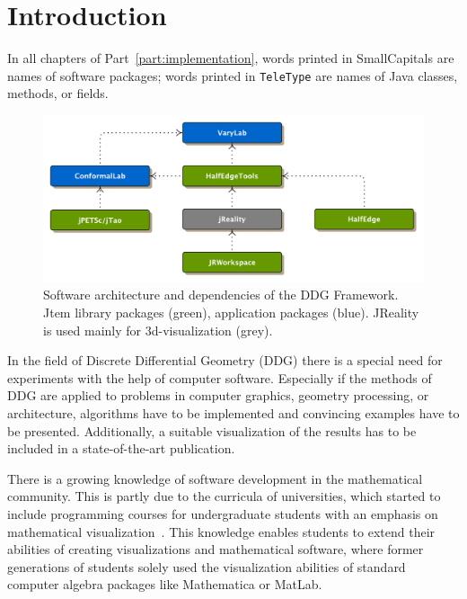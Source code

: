 \documentclass[Thesis.tex]{subfiles}
\begin{document}
\chapter{Introduction}

In all chapters of Part~\ref{part:implementation}, words printed in {\sc SmallCapitals} are names of software packages; words printed
in {\tt TeleType} are names of {\sc Java} classes, methods, or fields.

\begin{figure}[h]
	\centering
	\includegraphics[width=\linewidth]{figures/software_architecture}
	\caption[Software package dependencies]{
		Software architecture and dependencies of the DDG Framework. 
		{\sc Jtem} library packages (green), application packages (blue). {\sc JReality} is used mainly for 3d-visualization (grey).}
	\label{fig:software_architecture}
\end{figure}

In the field of Discrete Differential Geometry (DDG) there is a special need for experiments
with the help of computer software. Especially if the methods of DDG are applied
to problems in computer graphics, geometry processing, or architecture, algorithms have 
to be implemented and convincing examples have to be presented. Additionally, a suitable 
visualization of the results has to be included in a state-of-the-art publication.

There is a growing knowledge of software development in the mathematical community. This 
is partly due to the curricula of universities, which started to include programming courses for 
undergraduate students with an emphasis on mathematical visualization~\cite{VisMathHomepage, 
CaltechVisMath}. This knowledge enables students to extend their abilities of creating visualizations and 
mathematical software, where former generations of students solely used the visualization 
abilities of standard computer algebra packages like Mathematica or MatLab.
\end{document}
